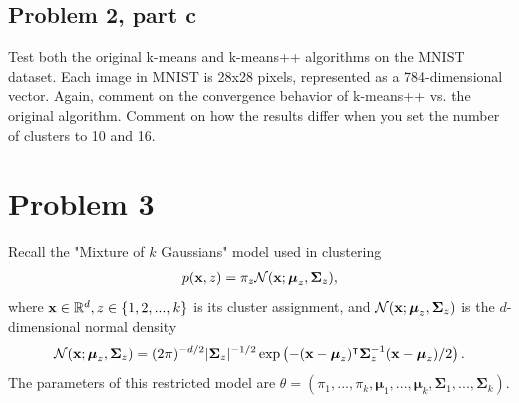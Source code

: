 \clearpage
\newpage
\subsection{Problem 2, part c}
Test both the original k-means and k-means++ algorithms on the MNIST dataset. Each image in MNIST is 28x28 pixels, represented as a 784-dimensional vector. Again, comment on the convergence behavior of k-means++ vs. the original algorithm. Comment on how the results differ when you set the number of clusters to 10 and 16.
\partbreak
\begin{solution}

    
\end{solution}


\newpage
\section{Problem 3}
Recall the "Mixture of $k$ Gaussians" model used in clustering
\begin{align}
    p(\textbf{x}, z) = \pi_z \mathcal{N} (\textbf{x};\boldsymbol{\mu}_z, \boldsymbol{\Sigma}_z), \label{Gauss}
\end{align}
where $\textbf{x} \in \mathbb{R}^d, z \in \{1, 2, ..., k\}$ is its cluster assignment, and $\mathcal{N} (\textbf{x};\boldsymbol{\mu}_z, \boldsymbol{\Sigma}_z)$ is the $d$-dimensional normal density
\[\mathcal{N} (\textbf{x};\boldsymbol{\mu}_z, \boldsymbol{\Sigma}_z) = (2\pi)^{-d/2} |\boldsymbol{\Sigma}_z|^{-1/2} \exp \left( -(\textbf{x} - \boldsymbol{\mu}_z)^{\intercal} \boldsymbol{\Sigma}_z^{-1} (\textbf{x} - \boldsymbol{\mu}_z) / 2\right).\]
The parameters of this restricted model are $\theta = (\pi_1, ..., \pi_k, \boldsymbol{\mu}_1, ..., \boldsymbol{\mu}_k, \boldsymbol{\Sigma}_1, ..., \boldsymbol{\Sigma}_k).$

